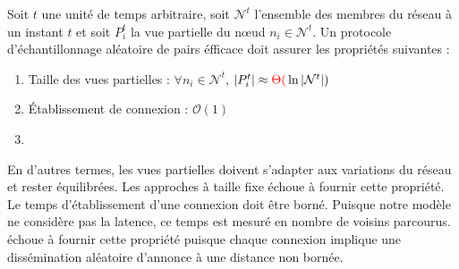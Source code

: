 \begin{problem}
  \label{net:problem:properties}
  Soit $t$ une unité de temps arbitraire, soit $\mathcal{N}^t$ l'ensemble des
  membres du réseau à un instant $t$ et soit $P_i^t$ la vue partielle du nœud
  $n_i \in \mathcal{N}^t$. Un protocole d'échantillonnage aléatoire de pairs
  éfficace doit assurer les propriétés suivantes :
  \begin{enumerate}
  \item Taille des vues partielles : \hfill $\forall n_i \in \mathcal{N}^t$,
    $|P_i^t| \approx \textcolor{red}{\Theta(} \ln |\mathcal{N}^t|)$
  \item Établissement de connexion : \hfill $\mathcal{O}(1)$
  \item {}
  \end{enumerate}
\end{problem}
En d'autres termes, les vues partielles doivent s'adapter aux variations du
réseau et rester équilibrées. Les approches à taille fixe échoue à fournir cette
propriété. Le temps d'établissement d'une connexion doit être borné. Puisque
notre modèle ne considère pas la latence, ce temps est mesuré en nombre de
voisins parcourus. \SCAMP échoue à fournir cette propriété puisque chaque
connexion implique une dissémination aléatoire d'annonce à une distance
non bornée.

